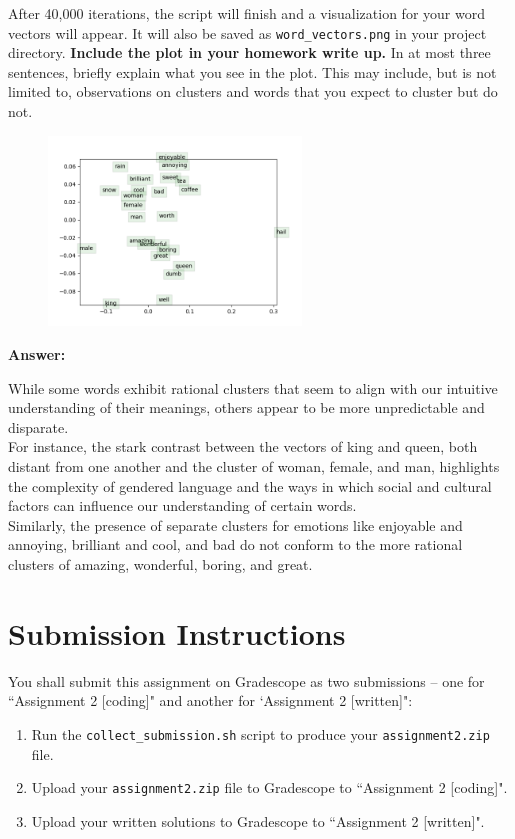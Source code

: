 \documentclass{article}
\newenvironment{answer}{
    {\bf Answer:} \sf \begingroup\color{red}
}{\endgroup}%
\begin{document}
\begin{enumerate}[label=(\alph*)]
    After 40,000 iterations, the script will finish and a visualization for your word vectors will appear. It will also be saved as \texttt{word\_vectors.png} in your project directory. \textbf{Include the plot in your homework write up.} In at most three sentences, briefly explain what you see in the plot. This may include, but is not limited to, observations on clusters and words that you expect to cluster but do not.
\begin{figure}[h]
    \centering
    \includegraphics[width=0.6\textwidth]{word_vectors.png}
    \label{fig:word_vectors.png}
\end{figure}
\begin{shaded}
\begin{answer}
While some words exhibit rational clusters that seem to align with our intuitive understanding of their meanings, others appear to be more unpredictable and disparate. \\
For instance, the stark contrast between the vectors of king and queen, both distant from one another and the cluster of woman, female, and man, highlights the complexity of gendered language and the ways in which social and cultural factors can influence our understanding of certain words. \\
Similarly, the presence of separate clusters for emotions like enjoyable and annoying, brilliant and cool, and bad do not conform to the more rational clusters of amazing, wonderful, boring, and great.
\end{answer}
\end{shaded}

\section{Submission Instructions}
You shall submit this assignment on Gradescope as two submissions -- one for ``Assignment 2 [coding]" and another for `Assignment 2 [written]":
\begin{enumerate}
    \item Run the \texttt{collect\_submission.sh} script to produce your \texttt{assignment2.zip} file.
    \item Upload your \texttt{assignment2.zip} file to Gradescope to ``Assignment 2 [coding]".
    \item Upload your written solutions to Gradescope to ``Assignment 2 [written]".
\end{enumerate}

\end{enumerate}
\end{document}
